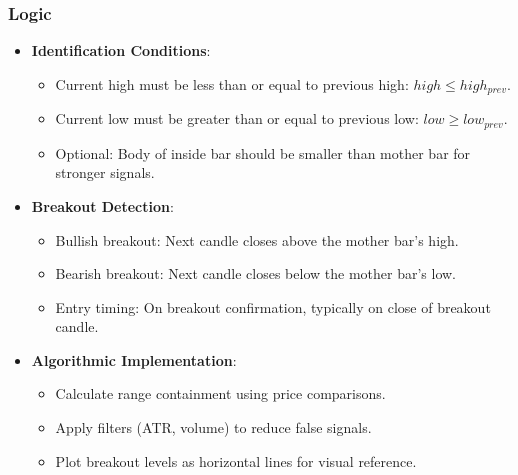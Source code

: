 \documentclass[12pt]{article}
\begin{document}
\subsubsection{Logic}
\begin{itemize}
\item \textbf{Identification Conditions}:
  \begin{itemize}
  \item Current high must be less than or equal to previous high: \( high \leq high_{prev} \).
  \item Current low must be greater than or equal to previous low: \( low \geq low_{prev} \).
  \item Optional: Body of inside bar should be smaller than mother bar for stronger signals.
  \end{itemize}
\item \textbf{Breakout Detection}:
  \begin{itemize}
  \item Bullish breakout: Next candle closes above the mother bar's high.
  \item Bearish breakout: Next candle closes below the mother bar's low.
  \item Entry timing: On breakout confirmation, typically on close of breakout candle.
  \end{itemize}
\item \textbf{Algorithmic Implementation}:
  \begin{itemize}
  \item Calculate range containment using price comparisons.
  \item Apply filters (ATR, volume) to reduce false signals.
  \item Plot breakout levels as horizontal lines for visual reference.
  \end{itemize}
\end{itemize}
\end{document}

